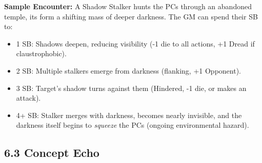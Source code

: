 \documentclass[11pt]{article}
\begin{document}
\textbf{Sample Encounter:} A Shadow Stalker hunts the PCs through an abandoned temple, its form a shifting mass of deeper darkness. The GM can spend their SB to:
\begin{itemize}
\item 1 SB: Shadows deepen, reducing visibility (-1 die to all actions, +1 Dread if claustrophobic).
\item 2 SB: Multiple stalkers emerge from darkness (flanking, +1 Opponent).
\item 3 SB: Target's shadow turns against them (Hindered, -1 die, or makes an attack).
\item 4+ SB: Stalker merges with darkness, becomes nearly invisible, and the darkness itself begins to \textit{squeeze} the PCs (ongoing environmental hazard).
\end{itemize}

\clearpage

\subsection*{6.3 Concept Echo}
\end{document}
